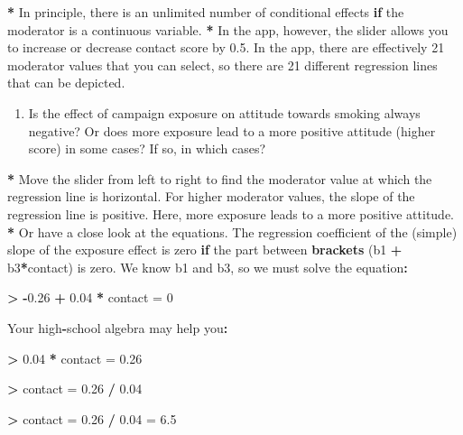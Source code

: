 \documentclass[a4paper]{book}
\newenvironment{Shaded}{\begin{snugshade}}{\end{snugshade}}
\newcommand{\KeywordTok}[1]{\textcolor[rgb]{0,0,0}{\textbf{#1}}}
\newcommand{\DecValTok}[1]{\textcolor[rgb]{0.00,0.00,0.00}{#1}}
\newcommand{\FloatTok}[1]{\textcolor[rgb]{0.00,0.00,0.00}{#1}}
\newcommand{\StringTok}[1]{\textcolor[rgb]{0.00,0.00,0.00}{#1}}
\newcommand{\ControlFlowTok}[1]{\textcolor[rgb]{0.00,0.00,0.00}{\textbf{#1}}}
\newcommand{\OperatorTok}[1]{\textcolor[rgb]{0.00,0.00,0.00}{\textbf{#1}}}
\newcommand{\ErrorTok}[1]{\textcolor[rgb]{0.00,0.00,0.00}{\textbf{#1}}}
\newcommand{\NormalTok}[1]{#1}
\providecommand{\tightlist}{%
  \setlength{\itemsep}{0pt}\setlength{\parskip}{0pt}}
\theoremstyle{definition}
\theoremstyle{definition}
\theoremstyle{definition}
\theoremstyle{remark}
\begin{document}
\begin{Shaded}
\begin{Highlighting}[]
\OperatorTok{*}\StringTok{ }\NormalTok{In principle, there is an unlimited number of conditional effects }\ControlFlowTok{if}\NormalTok{ the}
\NormalTok{moderator is a continuous variable.}
\OperatorTok{*}\StringTok{ }\NormalTok{In the app, however, the slider allows you to increase or decrease contact}
\NormalTok{score by }\FloatTok{0.5}\NormalTok{. In the app, there are effectively }\DecValTok{21}\NormalTok{ moderator values that you}
\NormalTok{can select, so there are }\DecValTok{21}\NormalTok{ different regression lines that can be depicted.}
\end{Highlighting}
\end{Shaded}

\begin{enumerate}
\def\labelenumi{\arabic{enumi}.}
\setcounter{enumi}{1}
\tightlist
\item
  Is the effect of campaign exposure on attitude towards smoking always
  negative? Or does more exposure lead to a more positive attitude
  (higher score) in some cases? If so, in which cases?
\end{enumerate}

\begin{Shaded}
\begin{Highlighting}[]
\OperatorTok{*}\StringTok{ }\NormalTok{Move the slider from left to right to find the moderator value at which the}
\NormalTok{regression line is horizontal. For higher moderator values, the slope of the}
\NormalTok{regression line is positive. Here, more exposure leads to a more positive}
\NormalTok{attitude.}
\OperatorTok{*}\StringTok{ }\NormalTok{Or have a close look at the equations. The regression coefficient of the}
\NormalTok{(simple) slope of the exposure effect is zero }\ControlFlowTok{if}\NormalTok{ the part between }\KeywordTok{brackets}\NormalTok{ (b1}
\OperatorTok{+}\StringTok{ }\NormalTok{b3}\OperatorTok{*}\NormalTok{contact) is zero. We know b1 and b3, so we must solve the equation}\OperatorTok{:}

\ErrorTok{>}\StringTok{ }\OperatorTok{-}\FloatTok{0.26} \OperatorTok{+}\StringTok{ }\FloatTok{0.04} \OperatorTok{*}\StringTok{ }\NormalTok{contact =}\StringTok{ }\DecValTok{0}

\NormalTok{Your high}\OperatorTok{-}\NormalTok{school algebra may help you}\OperatorTok{:}

\ErrorTok{>}\StringTok{ }\FloatTok{0.04} \OperatorTok{*}\StringTok{ }\NormalTok{contact =}\StringTok{ }\FloatTok{0.26}

\OperatorTok{>}\StringTok{ }\NormalTok{contact =}\StringTok{ }\FloatTok{0.26} \OperatorTok{/}\StringTok{ }\FloatTok{0.04}

\OperatorTok{>}\StringTok{ }\NormalTok{contact =}\StringTok{ }\FloatTok{0.26} \OperatorTok{/}\StringTok{ }\FloatTok{0.04}\NormalTok{ =}\StringTok{ }\FloatTok{6.5}
\end{Highlighting}
\end{Shaded}
\end{document}
